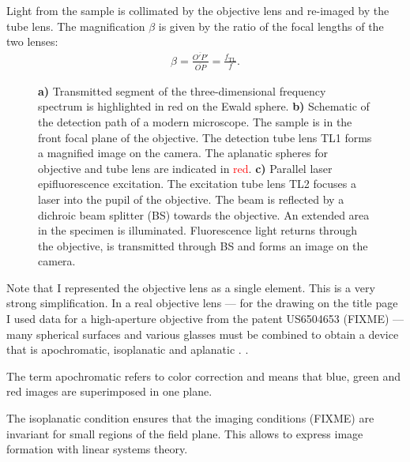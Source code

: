 Light from the sample is collimated by the objective lens and
re-imaged by the tube lens. The magnification $\beta$ is given by the
ratio of the focal lengths of the two lenses:
\begin{align}
  \beta=\frac{\overline{O'P'}}{\overline{OP}}=\frac{f_\mathrm{TL}}{f}.
\end{align}

\begin{figure}[!hbt]
  \centering
  \caption{{\bf a)} Transmitted segment of the three-dimensional
    frequency spectrum is highlighted in red on the Ewald sphere. {\bf
      b)} Schematic of the detection path of a modern microscope. The
    sample is in the front focal plane of the objective. The detection
    tube lens TL1 forms a magnified image on the camera. The aplanatic
    spheres for objective and tube lens are indicated in
    \textcolor{red}{red}. {\bf c)} Parallel laser epifluorescence
    excitation. The excitation tube lens TL2 focuses a laser into the
    pupil of the objective. The beam is reflected by a dichroic beam
    splitter (BS) towards the objective. An extended area in the
    specimen is illuminated. Fluorescence light returns through the
    objective, is transmitted through BS and forms an image on the
    camera. }
  \label{fig:widefield-microscope}
\end{figure}

Note that I represented the objective lens as a single element.  This
is a very strong simplification. In a real objective lens --- for the
drawing on the title page I used data for a high-aperture objective
from the patent US6504653 (FIXME) --- many spherical surfaces and
various glasses must be combined to obtain a device that is
apochromatic, isoplanatic and aplanatic \citep{Gross2005}.
.






The term apochromatic refers to color correction and means that blue,
green and red images are superimposed in one plane.

The isoplanatic condition ensures that the imaging conditions (FIXME)
are invariant for small regions of the field plane. This allows to
express image formation with linear systems theory.

